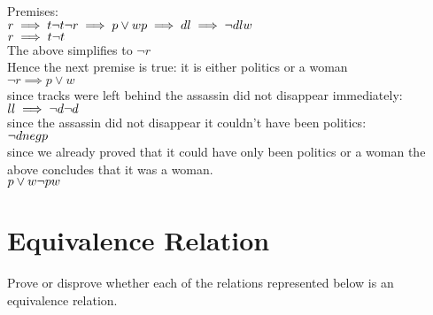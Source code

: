 \documentclass[addpoints]{exam}
\begin{document}
\begin{questions}
\begin{solution}
    \\ 
    \\ Premises:
    \\ $r \implies t
    \\ \neg t
    \\ \neg r \implies p \lor w
    \\ p \implies d
    \\ l  \implies \neg d
    \\ l
    \\ w$
    \hline
    \\ $r \implies t
    \\ \neg t $
    \\ The above simplifies to $\neg r $
    \\ Hence the next premise is true: it is either politics or a woman
    \\ $\neg r \implies p \lor w$
    \\ since tracks were left behind the assassin did not disappear immediately:
    \\ $l
    \\ l \implies \neg d
    \\ \neg d $
    \\ since the assassin did not disappear it couldn't have been politics:
    \\ $\neg d 
    \\ neg p$
    \\ since we already proved that it could have only been politics or a woman the above concludes that it was a woman.
    \\ $p \lor w
    \\ \neg p
    \\ w$
  \end{solution}
  
  \section{Equivalence Relation}
  
\question Prove or disprove whether each of the relations represented below is an equivalence relation.
\end{questions}
\end{document}
